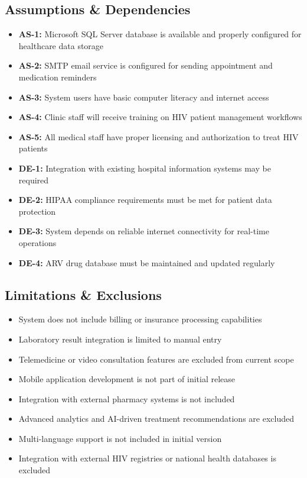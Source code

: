 \documentclass[12pt,a4paper]{article}
\begin{document}
\subsection{Assumptions \& Dependencies}

\begin{itemize}
    \item \textbf{AS-1:} Microsoft SQL Server database is available and properly configured for healthcare data storage
    \item \textbf{AS-2:} SMTP email service is configured for sending appointment and medication reminders
    \item \textbf{AS-3:} System users have basic computer literacy and internet access
    \item \textbf{AS-4:} Clinic staff will receive training on HIV patient management workflows
    \item \textbf{AS-5:} All medical staff have proper licensing and authorization to treat HIV patients
    \item \textbf{DE-1:} Integration with existing hospital information systems may be required
    \item \textbf{DE-2:} HIPAA compliance requirements must be met for patient data protection
    \item \textbf{DE-3:} System depends on reliable internet connectivity for real-time operations
    \item \textbf{DE-4:} ARV drug database must be maintained and updated regularly
\end{itemize}

\subsection{Limitations \& Exclusions}

\begin{itemize}
    \item System does not include billing or insurance processing capabilities
    \item Laboratory result integration is limited to manual entry
    \item Telemedicine or video consultation features are excluded from current scope
    \item Mobile application development is not part of initial release
    \item Integration with external pharmacy systems is not included
    \item Advanced analytics and AI-driven treatment recommendations are excluded
    \item Multi-language support is not included in initial version
    \item Integration with external HIV registries or national health databases is excluded
\end{itemize}
\end{document}
